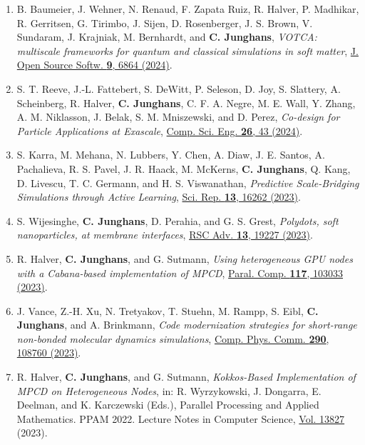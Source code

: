 \documentclass{article}
\begin{document}
\begin{enumerate}
\item[46.] B. Baumeier, J. Wehner, N. Renaud, F. Zapata Ruiz, R. Halver, P. Madhikar, R. Gerritsen, G. Tirimbo, J. Sijen, D. Rosenberger, J. S. Brown, V. Sundaram, J. Krajniak, M. Bernhardt, and \textbf{C. Junghans},
    \textit{VOTCA: multiscale frameworks for quantum and classical simulations in soft matter},
    \href{https://doi.org/10.21105/joss.06864}{J. Open Source Softw. \textbf{9}, 6864 (2024)}.

\item[45.]S. T. Reeve, J.-L. Fattebert, S. DeWitt, P. Seleson, D. Joy, S. Slattery, A. Scheinberg, R. Halver, \textbf{C. Junghans}, C. F. A. Negre, M. E. Wall, Y. Zhang, A. M. Niklasson, J. Belak, S. M. Mniszewski, and D. Perez,
   \textit{Co-design for Particle Applications at Exascale},
   \href{https://doi.org/10.1109/MCSE.2024.3384052}{Comp. Sci. Eng. \textbf{26}, 43 (2024)}.

\item[44.] S. Karra, M. Mehana, N. Lubbers, Y. Chen, A. Diaw, J. E. Santos, A. Pachalieva, R. S. Pavel, J. R. Haack, M. McKerns, \textbf{C. Junghans}, Q. Kang, D. Livescu, T. C. Germann, and H. S. Viswanathan, 
  \textit{Predictive Scale-Bridging Simulations through Active Learning},
  \href{https://doi.org/10.1038/s41598-023-42823-6}{Sci. Rep. \textbf{13}, 16262 (2023)}.

\item[43.] S. Wijesinghe, \textbf{C. Junghans}, D. Perahia, and G. S. Grest,
   \textit{Polydots, soft nanoparticles, at membrane interfaces},
    \href{https://doi.org/10.1039/d3ra02085a}{RSC Adv. \textbf{13}, 19227 (2023)}.

\item[42.] R. Halver, \textbf{C. Junghans}, and G. Sutmann,
   \textit{Using heterogeneous GPU nodes with a Cabana-based implementation of MPCD},
   \href{https://doi.org/10.1016/j.parco.2023.103033}{Paral. Comp. \textbf{117}, 103033 (2023)}.

\item[41.] J. Vance, Z.-H. Xu, N. Tretyakov, T. Stuehn, M. Rampp, S. Eibl, \textbf{C. Junghans}, and A. Brinkmann,
   \textit{Code modernization strategies for short-range non-bonded molecular dynamics simulations},
   \href{https://doi.org/10.1016/j.cpc.2023.108760}{Comp. Phys. Comm. \textbf{290}, 108760 (2023)}.

\item[40.] R. Halver, \textbf{C. Junghans}, and G. Sutmann,
   \textit{Kokkos-Based Implementation of MPCD on Heterogeneous Nodes},
   in: R. Wyrzykowski, J. Dongarra, E. Deelman, and K. Karczewski (Eds.),
   Parallel Processing and Applied Mathematics. PPAM 2022. Lecture Notes in Computer Science, \href{https://doi.org/10.1007/978-3-031-30445-3_1}{Vol. 13827} (2023).


\end{enumerate}
\end{document}
